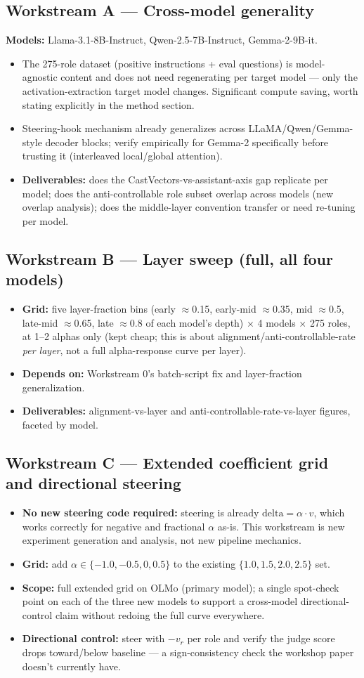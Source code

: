 \documentclass[11pt]{article}
\newcommand{\workstream}[2]{\subsection*{Workstream #1 --- #2}}
\begin{document}
\workstream{A}{Cross-model generality}
\textbf{Models:} Llama-3.1-8B-Instruct, Qwen-2.5-7B-Instruct, Gemma-2-9B-it.
\begin{itemize}
  \item The 275-role dataset (positive instructions + eval questions) is model-agnostic
    content and does not need regenerating per target model --- only the
    activation-extraction target model changes. Significant compute saving, worth stating
    explicitly in the method section.
  \item Steering-hook mechanism already generalizes across LLaMA/Qwen/Gemma-style decoder
    blocks; verify empirically for Gemma-2 specifically before trusting it (interleaved
    local/global attention).
  \item \textbf{Deliverables:} does the CastVectors-vs-assistant-axis gap replicate per
    model; does the anti-controllable role subset overlap across models (new overlap
    analysis); does the middle-layer convention transfer or need re-tuning per model.
\end{itemize}

\workstream{B}{Layer sweep (full, all four models)}
\begin{itemize}
  \item \textbf{Grid:} five layer-fraction bins (early $\approx$0.15, early-mid
    $\approx$0.35, mid $\approx$0.5, late-mid $\approx$0.65, late $\approx$0.8 of each
    model's depth) $\times$ 4 models $\times$ 275 roles, at 1--2 alphas only (kept cheap;
    this is about alignment/anti-controllable-rate \emph{per layer}, not a full
    alpha-response curve per layer).
  \item \textbf{Depends on:} Workstream 0's batch-script fix and layer-fraction
    generalization.
  \item \textbf{Deliverables:} alignment-vs-layer and anti-controllable-rate-vs-layer
    figures, faceted by model.
\end{itemize}

\workstream{C}{Extended coefficient grid and directional steering}
\begin{itemize}
  \item \textbf{No new steering code required:} steering is already
    $\text{delta} = \alpha \cdot v$, which works correctly for negative and fractional
    $\alpha$ as-is. This workstream is new experiment generation and analysis, not new
    pipeline mechanics.
  \item \textbf{Grid:} add $\alpha \in \{-1.0, -0.5, 0, 0.5\}$ to the existing
    $\{1.0, 1.5, 2.0, 2.5\}$ set.
  \item \textbf{Scope:} full extended grid on OLMo (primary model); a single spot-check
    point on each of the three new models to support a cross-model directional-control
    claim without redoing the full curve everywhere.
  \item \textbf{Directional control:} steer with $-v_r$ per role and verify the judge score
    drops toward/below baseline --- a sign-consistency check the workshop paper doesn't
    currently have.
\end{itemize}
\end{document}
